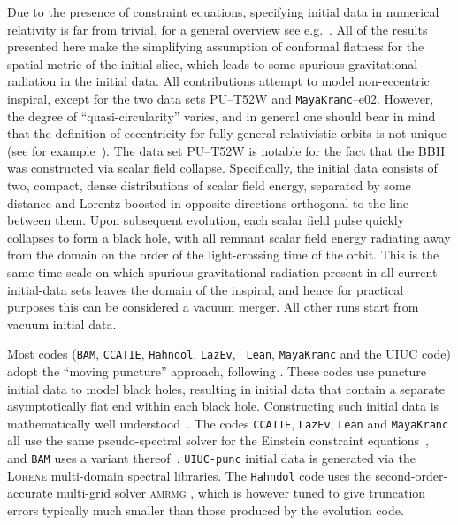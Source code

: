 Due to the presence of constraint equations, specifying initial data
in numerical relativity is far from trivial, for a general overview
see e.g.~\cite{Cook:2000vr}.  All of the results presented here make
the simplifying assumption of conformal flatness for the spatial
metric of the initial slice, which leads to some spurious
gravitational radiation in the initial data.  All contributions
attempt to model non-eccentric inspiral, except for the two data sets
PU--T52W and {\tt MayaKranc}--e02.  However, the degree of
``quasi-circularity'' varies, and in general one should bear in mind
that the definition of eccentricity for fully general-relativistic
orbits is not unique (see for
example~\cite{Sperhake:2007gu,Hinder:2007qu}).   The data set PU--T52W
is notable for the fact that the BBH was constructed via scalar field
collapse. Specifically, the initial data consists of two, compact,
dense distributions of scalar field energy, separated by some distance
and Lorentz boosted in opposite directions orthogonal to the line
between them. Upon subsequent evolution, each scalar field pulse
quickly collapses to form a black hole, with all remnant scalar field
energy radiating away from the domain on the order of the
light-crossing time of the orbit. This is the same time scale on which
spurious gravitational radiation present in all current initial-data
sets leaves the domain of the inspiral, and hence for practical
purposes this can be considered a vacuum merger.  All other runs start
from vacuum initial data. 

Most codes ({\tt BAM}, {\tt CCATIE}, {\tt Hahndol}, {\tt LazEv}, {\tt
Lean}, {\tt MayaKranc} and the UIUC code) adopt the ``moving
puncture'' approach, following \cite{Campanelli:2005dd,Baker:2005vv}.
These codes use puncture initial data
\cite{Bowen:1980yu,Beig:1993gt,Brandt:1997tf} to model black holes,
resulting in initial data that contain a separate asymptotically flat
end within each black hole.  Constructing such initial data is
mathematically well understood~\cite{Beig:1993gt,Dain:2001ry}. 
The codes {\tt CCATIE}, {\tt LazEv}, {\tt Lean} and {\tt MayaKranc}
all use the same pseudo-spectral solver for the Einstein constraint
equations~\cite{Ansorg:2004ds}, and {\tt BAM} uses a variant
thereof~\cite{Husa:2007hp}.  {\tt UIUC-punc} initial data is generated
via the \textsc{Lorene} \cite{Lorene} multi-domain spectral libraries.
The {\tt Hahndol} code uses the second-order-accurate multi-grid
solver \textsc{amrmg} \cite{Brown:2004ma}, which is however tuned to
give truncation errors typically much smaller than those produced by
the evolution code.

